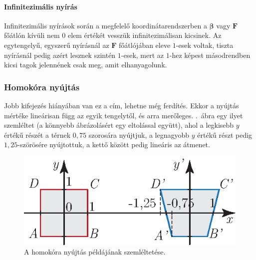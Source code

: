 \documentclass[12pt,a4paper]{scrartcl}
\let\mathbf\bm
\begin{document}
\paragraph{Infinitezimális nyírás}
Infinitezimális nyírások során a megfelelő koordinátarendszerben a ${\mathbf{\beta }}$ vagy ${\mathbf{F}}$ főátlón kívüli nem $0$ elem értékét vesszük infinitezimálisan kicsinek. Az egytengelyű, egyszerű nyírásnál az ${\mathbf{F}}$ főátlójában eleve $1$-esek voltak, tiszta nyírásnál pedig azért lesznek szintén $1$-esek, mert az $1$-hez képest másodrendben kicsi tagok jelennének csak meg, amit elhanyagolunk.

\subsubsection{Homokóra nyújtás}
Jobb kifejezés hiányában van ez a cím, lehetne még ferdítés. Ekkor a nyújtás mértéke lineárisan függ az egyik tengelytől, és arra merőleges. .\ ábra egy ilyet szemléltet (a könnyebb ábrázolásért egy eltolással együtt), ahol a legkisebb $y$ értékű részét a térnek $0{,}75$ szorosára nyújtjuk, a legnagyobb $y$ értékű részt pedig $1{,}25$-szörösére nyújtottuk, a kettő között pedig lineáris az átmenet.
\begin{figure}[htb] 
\centering    
\includegraphics[scale=1]{figs/homokora_nyujtas_szamolos.eps}
\caption{A homokóra nyújtás példájának szemléltetése.}
\label{fig:homokora_nyujtas_szamolos}
\end{figure}

\footnotesize
\end{document}
